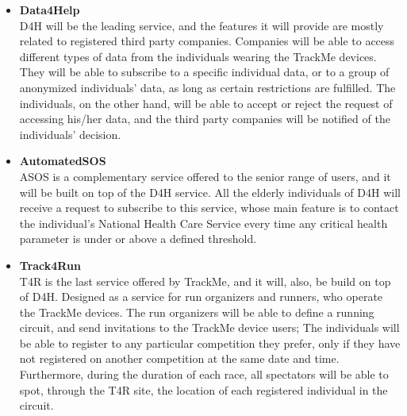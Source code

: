 \documentclass[hidelinks, 12pt]{report}
\begin{document}
\begin{itemize}
\item{\textbf{Data4Help}}
\\D4H will be the leading service, and the features it will provide are mostly related to registered third party companies. Companies will be able to access different types of data from the individuals wearing the TrackMe devices. They will be able to subscribe to a specific individual data, or to a group of anonymized individuals' data, as long as certain restrictions are fulfilled. The individuals, on the other hand, will be able to accept or reject the request of accessing his/her data, and the third party companies will be notified of the individuals' decision.

\item{\textbf{AutomatedSOS}}
\\ ASOS is a complementary service offered to the senior range of users, and it will be built on top of the D4H service. All the elderly individuals of D4H will receive a request to subscribe to this service, whose main feature is to contact the individual's National Health Care Service every time any critical health parameter is under or above a defined threshold. 

\item{\textbf{Track4Run}}
\\T4R is the last service offered by TrackMe, and it will, also, be build on top of D4H. Designed as a service for run organizers and runners, who operate the TrackMe devices. The run organizers will be able to define a running circuit, and send invitations to the TrackMe device users; The individuals will be able to register to any particular competition they prefer, only if they have not registered on another competition at the same date and time. Furthermore, during the duration of each race, all spectators will be able to spot, through the T4R site, the location of each registered individual in the circuit.
\end{itemize}
\end{document}
